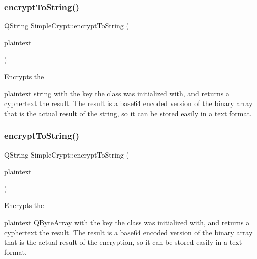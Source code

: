 \subsubsection{\texorpdfstring{encrypt\+To\+String()}{encryptToString()}\hspace{0.1cm}{\footnotesize\ttfamily [1/2]}}
{\footnotesize\ttfamily Q\+String Simple\+Crypt\+::encrypt\+To\+String (\begin{DoxyParamCaption}\item[{const Q\+String \&}]{plaintext }\end{DoxyParamCaption})}

Encrypts the \begin{DoxyItemize}
\item plaintext string with the key the class was initialized with, and returns a cyphertext the result. The result is a base64 encoded version of the binary array that is the actual result of the string, so it can be stored easily in a text format. \end{DoxyItemize}
\mbox{\label{classSimpleCrypt_aa72b79bf7a5bb971bf3b0a52b9247efd}} 
\subsubsection{\texorpdfstring{encrypt\+To\+String()}{encryptToString()}\hspace{0.1cm}{\footnotesize\ttfamily [2/2]}}
{\footnotesize\ttfamily Q\+String Simple\+Crypt\+::encrypt\+To\+String (\begin{DoxyParamCaption}\item[{Q\+Byte\+Array}]{plaintext }\end{DoxyParamCaption})}

Encrypts the \begin{DoxyItemize}
\item plaintext Q\+Byte\+Array with the key the class was initialized with, and returns a cyphertext the result. The result is a base64 encoded version of the binary array that is the actual result of the encryption, so it can be stored easily in a text format. \end{DoxyItemize}
\mbox{\label{classSimpleCrypt_ad800808bcffc9a09225c651200b3ef5c}} 
